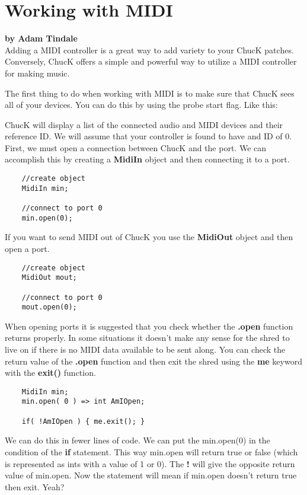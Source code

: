 \section{Working with MIDI}
\textbf{by Adam Tindale}\\

Adding a MIDI controller is a great way to add variety to your ChucK patches. Conversely, ChucK offers a simple and powerful way to utilize a MIDI controller for making music.  

The first thing to do when working with MIDI is to make sure that ChucK sees all of your devices. You can do this by using the \doubledash probe start flag. Like this:


ChucK will display a list of the connected audio and MIDI devices and their reference ID. We will assume that your controller is found to have and ID of 0. First, we must open a connection between ChucK and the port. We can accomplish this by creating a {\bf MidiIn} object and then connecting it to a port. 

\begin{verbatim}
    //create object
    MidiIn min;

    //connect to port 0
    min.open(0);
\end{verbatim}

If you want to send MIDI out of ChucK you use the {\bf MidiOut} object and then open a port. 

\begin{verbatim}
    //create object
    MidiOut mout;

    //connect to port 0
    mout.open(0);
\end{verbatim}

When opening ports it is suggested that you check whether the {\bf .open} function returns properly. In some situations it doesn't make any sense for the shred to live on if there is no MIDI data available to be sent along. You can check the return value of the {\bf .open} function and then exit the shred using the {\bf me} keyword with the {\bf exit()} function.

\begin{verbatim}
    MidiIn min;
    min.open( 0 ) => int AmIOpen;

    if( !AmIOpen ) { me.exit(); }
\end{verbatim}

We can do this in fewer lines of code. We can put the min.open(0) in the condition of the {\bf if} statement. This way min.open will return true or false (which is represented as ints with a value of 1 or 0). The {\bf !} will give the opposite return value of min.open. Now the statement will mean if min.open doesn't return true then exit. Yeah?

